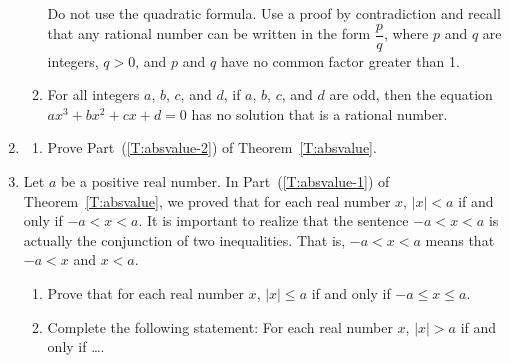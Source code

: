 \begin{enumerate}
\begin{enumerate}
\hint  Do not use the quadratic formula.  Use a proof by contradiction and recall that any rational number can be written in the form $\dfrac{p}{q}$, where $p$ and $q$ are integers, $q > 0$, and $p$ and $q$ have no common factor greater than 1.

\item For all integers $a$, $b$, $c$, and $d$, if $a$, $b$, $c$, and $d$ are odd, then the equation $ax^3 + bx^2 + cx + d = 0$ has no solution that is a rational number.
\end{enumerate}


\item \label{exer:absvalue} \begin{enumerate}
\yitem Prove Part~(\ref{P:absvalue-2}) of Proposition~\ref{P:absvalue}.

\item Prove Part~(\ref{T:absvalue-2}) of Theorem~\ref{T:absvalue}.
\end{enumerate}


\item Let $a$ be a positive real number.  In Part~(\ref{T:absvalue-1}) of 
Theorem~\ref{T:absvalue}, we proved that for each real number $x$, $\left| x \right| < a$ if and only if $-a < x < a$.  It is important to realize that the sentence $-a < x < a$ is actually the conjunction of two inequalities.  That is, $-a < x < a$ means that $-a < x$ and $x < a$.
\label{exer:absvaluex}%

\begin{enumerate}
\yitem Complete the following statement:  For each real number $x$, $\left| x \right| \geq a$ if and only if \ldots.

\item Prove that for each real number $x$, $\left| x \right| \leq a$ if and only if $-a \leq x \leq a$.

\item Complete the following statement:  For each real number $x$, $\left| x \right| > a$ if and only if \ldots.
\end{enumerate}


\end{enumerate}
